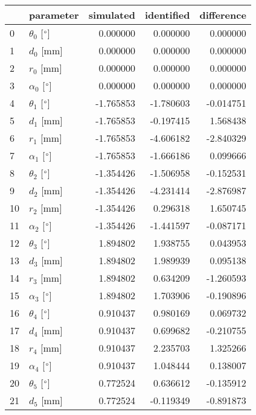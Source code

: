 \documentclass{standalone}%
\begin{document}
%
\normalsize%
\begin{tabular}{llrrr}
\toprule
{} &                 parameter & simulated & identified & difference \\
\midrule
0  &  $\theta_{0}$ [$\degree$] &  0.000000 &   0.000000 &   0.000000 \\
1  &              $d_{0}$ [mm] &  0.000000 &   0.000000 &   0.000000 \\
2  &              $r_{0}$ [mm] &  0.000000 &   0.000000 &   0.000000 \\
3  &  $\alpha_{0}$ [$\degree$] &  0.000000 &   0.000000 &   0.000000 \\
4  &  $\theta_{1}$ [$\degree$] & -1.765853 &  -1.780603 &  -0.014751 \\
5  &              $d_{1}$ [mm] & -1.765853 &  -0.197415 &   1.568438 \\
6  &              $r_{1}$ [mm] & -1.765853 &  -4.606182 &  -2.840329 \\
7  &  $\alpha_{1}$ [$\degree$] & -1.765853 &  -1.666186 &   0.099666 \\
8  &  $\theta_{2}$ [$\degree$] & -1.354426 &  -1.506958 &  -0.152531 \\
9  &              $d_{2}$ [mm] & -1.354426 &  -4.231414 &  -2.876987 \\
10 &              $r_{2}$ [mm] & -1.354426 &   0.296318 &   1.650745 \\
11 &  $\alpha_{2}$ [$\degree$] & -1.354426 &  -1.441597 &  -0.087171 \\
12 &  $\theta_{3}$ [$\degree$] &  1.894802 &   1.938755 &   0.043953 \\
13 &              $d_{3}$ [mm] &  1.894802 &   1.989939 &   0.095138 \\
14 &              $r_{3}$ [mm] &  1.894802 &   0.634209 &  -1.260593 \\
15 &  $\alpha_{3}$ [$\degree$] &  1.894802 &   1.703906 &  -0.190896 \\
16 &  $\theta_{4}$ [$\degree$] &  0.910437 &   0.980169 &   0.069732 \\
17 &              $d_{4}$ [mm] &  0.910437 &   0.699682 &  -0.210755 \\
18 &              $r_{4}$ [mm] &  0.910437 &   2.235703 &   1.325266 \\
19 &  $\alpha_{4}$ [$\degree$] &  0.910437 &   1.048444 &   0.138007 \\
20 &  $\theta_{5}$ [$\degree$] &  0.772524 &   0.636612 &  -0.135912 \\
21 &              $d_{5}$ [mm] &  0.772524 &  -0.119349 &  -0.891873 \\

\end{tabular}
\end{document}

